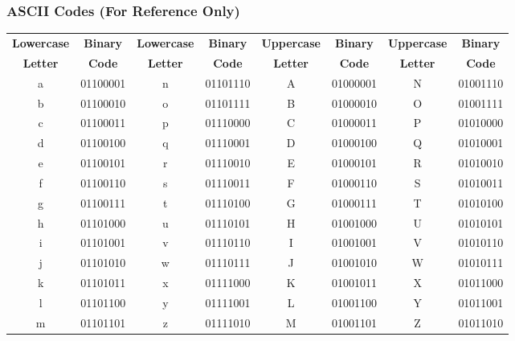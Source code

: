 \documentclass{beamer}
\begin{document}
\begin{frame}
\frametitle{ASCII Codes (For Reference Only)}
\begin{center}
\scriptsize
\begin{tabular}{|c|c|c|c|c|c|c|c|}
\hline
\textbf{Lowercase} & \textbf{Binary} & \textbf{Lowercase} & \textbf{Binary} & \textbf{Uppercase} & \textbf{Binary} & \textbf{Uppercase} & \textbf{Binary} \\
\textbf{Letter} & \textbf{Code} & \textbf{Letter} & \textbf{Code} & \textbf{Letter} & \textbf{Code} & \textbf{Letter} & \textbf{Code} \\
\hline
a & 01100001 & n & 01101110 & A & 01000001 & N & 01001110 \\
b & 01100010 & o & 01101111 & B & 01000010 & O & 01001111 \\
c & 01100011 & p & 01110000 & C & 01000011 & P & 01010000 \\
d & 01100100 & q & 01110001 & D & 01000100 & Q & 01010001 \\
e & 01100101 & r & 01110010 & E & 01000101 & R & 01010010 \\
f & 01100110 & s & 01110011 & F & 01000110 & S & 01010011 \\
g & 01100111 & t & 01110100 & G & 01000111 & T & 01010100 \\
h & 01101000 & u & 01110101 & H & 01001000 & U & 01010101 \\
i & 01101001 & v & 01110110 & I & 01001001 & V & 01010110 \\
j & 01101010 & w & 01110111 & J & 01001010 & W & 01010111 \\
k & 01101011 & x & 01111000 & K & 01001011 & X & 01011000 \\
l & 01101100 & y & 01111001 & L & 01001100 & Y & 01011001 \\
m & 01101101 & z & 01111010 & M & 01001101 & Z & 01011010 \\
\hline
\end{tabular}
\end{center}
\end{frame}
\end{document}
